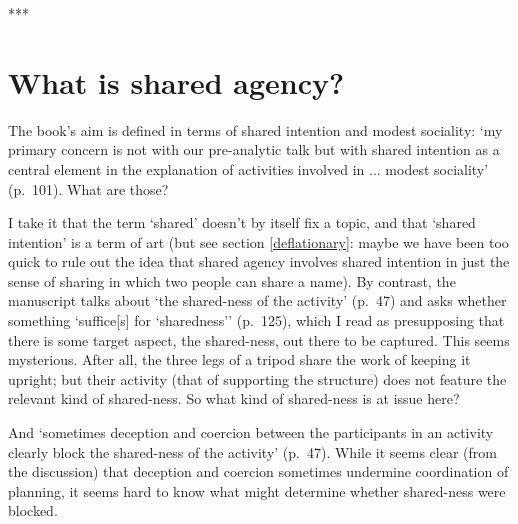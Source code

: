 \documentclass[12pt,letterpaper]{extarticle}
\begin{document}
\setlength\footnotesep{1em}




\maketitle

\tableofcontents




\begin{center}
\noindent
***
\end{center}

\section{What is shared agency?}
The book's aim is defined in terms of shared intention and modest sociality: `my primary concern is not with our pre-analytic talk but with shared intention as a central element in the explanation of activities involved in ... modest sociality' (p.\ 101).
What are those?

I take it that the term `shared' doesn't by itself fix a topic, and that `shared intention' is a term of art (but see section \vref{deflationary}: maybe we have been too quick to rule out the idea that shared agency involves shared intention in just the sense of sharing in which two people can share a name).
By contrast, the manuscript talks about `the shared-ness of the activity' (p.\ 47) and asks whether something `suffice[s] for `sharedness'' (p.\ 125), which I read as presupposing that there is some target aspect, the shared-ness, out there to be captured.
This seems mysterious.
After all, the three legs of a tripod share the work of keeping it upright; but their activity (that of supporting the structure) does not feature the relevant kind of shared-ness. 
So what kind of shared-ness is at issue here?

And `sometimes deception and coercion between the participants in an activity clearly block the shared-ness of the activity' (p.\ 47).
While it seems clear (from the discussion) that deception and coercion sometimes undermine coordination of planning, it seems hard to know what might determine whether shared-ness were blocked.
\end{document}
